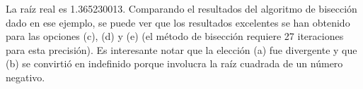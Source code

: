 La raíz real es 1.365230013. Comparando el resultados del algoritmo de bisección dado en ese ejemplo, se puede ver que los resultados excelentes se han obtenido para las opciones (c), (d) y (e) (el método de bisección requiere 27 iteraciones para esta precisión). Es interesante notar que la elección (a) fue divergente y que (b) se convirtió en indefinido porque involucra la raíz cuadrada de un número negativo. 